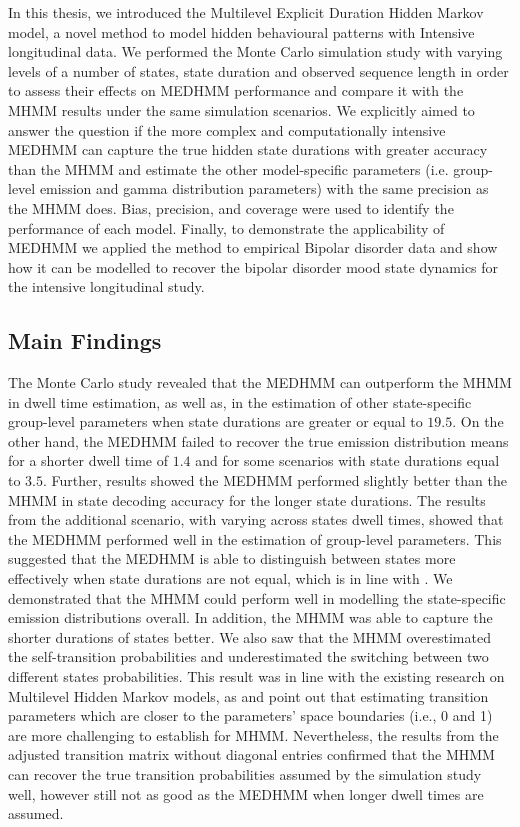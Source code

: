 In this thesis, we introduced the Multilevel Explicit Duration Hidden Markov model, a novel method to model hidden behavioural patterns with Intensive longitudinal data. We performed the Monte Carlo simulation study with varying levels of a number of states, state duration and observed sequence length in order to assess their effects on MEDHMM performance and compare it with the MHMM results under the same simulation scenarios. We explicitly aimed to answer the question if the more complex and computationally intensive MEDHMM can capture the true hidden state durations with greater accuracy than the MHMM and estimate the other model-specific parameters (i.e. group-level emission and gamma distribution parameters) with the same precision as the MHMM does. Bias, precision, and coverage were used to identify the performance of each model. Finally, to demonstrate the applicability of MEDHMM we applied the method to empirical Bipolar disorder data and show how it can be modelled to recover the bipolar disorder mood state dynamics for the intensive longitudinal study. 

\subsection{Main Findings}
The Monte Carlo study revealed that the MEDHMM can outperform the MHMM in dwell time estimation, as well as, in the estimation of other state-specific group-level parameters when state durations are greater or equal to $19.5$. On the other hand, the MEDHMM failed to recover the true emission distribution means for a shorter dwell time of $1.4$ and for some scenarios with state durations equal to $3.5$. Further, results showed the MEDHMM performed slightly better than the MHMM in state decoding accuracy for the longer state durations. The results from the additional scenario, with varying across states dwell times, showed that the MEDHMM performed well in the estimation of group-level parameters. This suggested that the MEDHMM is able to distinguish between states more effectively when state durations are not equal, which is in line with \cite{Ruiz_Suarez_2022}. We demonstrated that the MHMM could perform well in modelling the state-specific emission distributions overall. In addition, the MHMM was able to capture the shorter durations of states better. We also saw that the MHMM overestimated the self-transition probabilities and underestimated the switching between two different states probabilities. This result was in line with the existing research on Multilevel Hidden Markov models, as \cite{McClintock_2021} and \cite{jonsen2016joint} point out that estimating transition parameters which are closer to the parameters' space boundaries (i.e., 0 and 1) are more challenging to establish for MHMM. Nevertheless, the results from the adjusted transition matrix without diagonal entries confirmed that the MHMM can recover the true transition probabilities assumed by the simulation study well, however still not as good as the MEDHMM when longer dwell times are assumed. 

